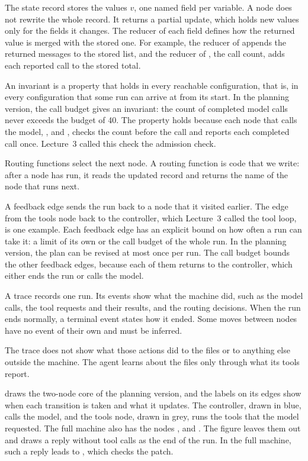 The state record stores the values $v$, one named field per variable. A node does not rewrite the
whole record. It returns a partial update, which holds new values only for the fields it changes.
The reducer of each field defines how the returned value is merged with the stored one. For example,
the reducer of  appends the returned messages to the stored list, and the reducer
of , the call count, adds each reported call to the stored total.

An invariant is a property that holds in every reachable configuration, that is, in every
configuration that some run can arrive at from its start. In the planning version, the call budget
gives an invariant: the count of completed model calls never exceeds the budget of 40. The property
holds because each node that calls the model, ,  and
, checks the count before the call and reports each completed call once.
Lecture~3 called this check the admission check.

Routing functions select the next node. A routing function is code that we write: after a node has
run, it reads the updated record and returns the name of the node that runs next.

A feedback edge sends the run back to a node that it visited earlier. The edge from the tools node
back to the controller, which Lecture~3 called the tool loop, is one example. Each feedback edge has
an explicit bound on how often a run can take it: a limit of its own or the call budget of the whole
run. In the planning version, the plan can be revised at most once per run. The call budget bounds
the other feedback edges, because each of them returns to the controller, which either ends the run
or calls the model.

A trace records one run. Its events show what the machine did, such as the model calls, the tool
requests and their results, and the routing decisions. When the run ends normally, a terminal event
states how it ended. Some moves between nodes have no event of their own and must be inferred.

The trace does not show what those actions did to the files or to anything else outside the
machine. The agent learns about the files only through what its tools report.

 draws the two-node core of the planning version, and the labels on its edges
show when each transition is taken and what it updates. The controller, drawn in blue, calls the
model, and the tools node, drawn in grey, runs the tools that the model requested. The full machine
also has the nodes ,  and . The figure leaves them
out and draws a reply without tool calls as the end of the run. In the full machine, such a reply
leads to , which checks the patch.


